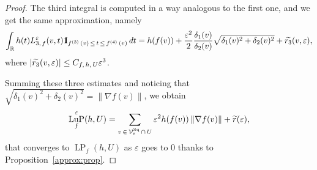 \documentclass[10pt]{amsart}
\theoremstyle{definition}\newtheorem{defi}[theo]{Definition}\newtheorem{rema}[theo]{Remark}\newtheorem{exam}[theo]{Example}\newtheorem{exem}[theo]{Example}\newtheorem{nota}[theo]{Notation}
\newcommand{\R}{\mathbb{R}}
\newcommand{\ind}{{1\!\!\mathrm{I}}}
\newcommand{\eps}{\varepsilon}
\DeclareMathOperator{\LP}{LP}
\DeclareMathOperator{\LuP}{LuP}
\DeclareMathOperator{\Sq}{Sq}
\newcommand{\calV}{\mathcal{V}}
\let\oldtilde\tilde
\renewcommand*{\tilde}[1]{\mathchoice{\widetilde{#1}}{\widetilde{#1}}{\oldtilde{#1}}{\oldtilde{#1}}}
\begin{document}
\begin{proof}
The third integral is computed in a way analogous to the first one, and we get the same approximation, namely
\[
\int_\R h(t)
L_{3,\,f}^\eps(v,t) \ind_{f^{(3)}\,(v)\,\leq\,t\,\leq\,f^{(4)}\,(v)} \, dt = h(f(v)) + \frac{\eps^2}{2} \frac{\delta_1(v)}{\delta_2(v)}
\sqrt{\delta_1(v)^2 + \delta_2(v)^2} + \tilde{r_3}(v,\eps),
\]
where
$|\tilde{r_3}(v,\eps)|\leq C_{f,\,h,\,U} \eps^3$.

Summing these three estimates and noticing that $\sqrt{\delta_1(v)^2 +
\delta_2(v)^2} = \| \nabla f(v) \| $, we obtain
\[
\LuP_f^\eps(h,U) = \sum_{v\,\in\,\calV^{\Sq}_\eps\,\cap\,U} \eps^2 h(f(v)) \left\| \nabla f(v)\right\|
+ \tilde{r}(\eps),
\]
that converges to $ \LP_f(h,U)$ as $\eps$ goes to $0$ thanks to Proposition~\ref{approx:prop}.
\end{proof}

\newpage
\end{document}
